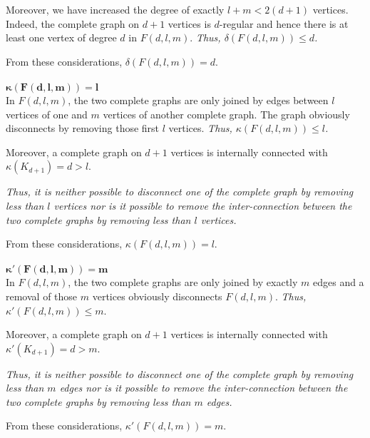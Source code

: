 \documentclass[a4paper]{article}
\begin{document}
\begin{solution}{14}
		Moreover, we have increased the degree of exactly $l + m < 2(d+1)$ vertices.  Indeed, the complete graph on $d+1$ vertices is $d$-regular and hence there is at least one vertex of degree $d$ in $F(d,l,m)$. \emph{Thus, $\delta(F(d,l,m)) \leq d$.}

		From these considerations, $\delta(F(d,l,m)) = d$.\ \\ \ \\
		$\mathbf{\kappa(F(d,l,m)) = l}$\\
		In $F(d,l,m)$, the two complete graphs are only joined by edges between $l$ vertices of one and $m$ vertices of another complete graph.
		The graph obviously disconnects by removing those first $l$ vertices. \emph{Thus, $\kappa(F(d,l,m)) \leq l$.}

		Moreover, a complete graph on $d+1$ vertices is internally connected with $\kappa(K_{d+1}) = d > l$. 

		\emph{Thus, it is neither possible to disconnect one of the complete graph by removing less than $l$ vertices nor is it possible to remove the inter-connection between the two complete graphs by removing less than $l$ vertices.}

		From these considerations, $\kappa(F(d,l,m)) = l$.\ \\ \ \\
		$\mathbf{\kappa'(F(d,l,m)) = m}$\\
		In $F(d,l,m)$, the two complete graphs are only joined by exactly $m$ edges and a removal of those $m$ vertices obviously disconnects $F(d, l, m)$. \emph{Thus, $\kappa'(F(d,l,m)) \leq m$}.

		Moreover, a complete graph on $d+1$ vertices is internally connected with $\kappa'(K_{d+1}) = d > m$.

		\emph{Thus, it is neither possible to disconnect one of the complete graph by removing less than $m$ edges nor is it possible to remove the inter-connection between the two complete graphs by removing less than $m$ edges.}

		From these considerations, $\kappa'(F(d,l,m)) = m$.
	\end{solution}
	\newpage
\end{document}
